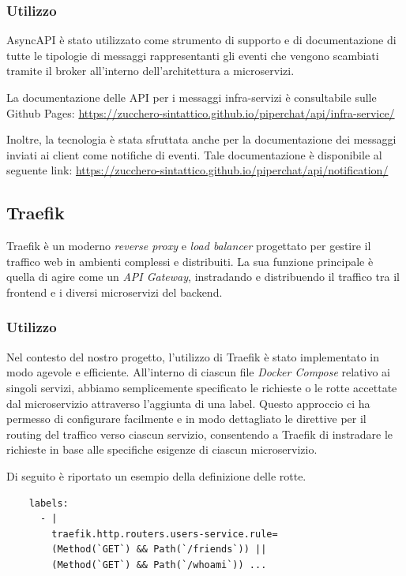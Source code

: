 %
%
%
\subsubsection{Utilizzo}

AsyncAPI è stato utilizzato come strumento di supporto e di documentazione di tutte le tipologie di messaggi rappresentanti gli eventi che vengono scambiati tramite il broker all'interno dell'architettura a microservizi.

La documentazione delle API per i messaggi infra-servizi è consultabile sulle Github Pages:
\url{https://zucchero-sintattico.github.io/piperchat/api/infra-service/}

Inoltre, la tecnologia è stata sfruttata anche per la documentazione dei messaggi inviati ai client come notifiche di eventi.
Tale documentazione è disponibile al seguente link:
\url{https://zucchero-sintattico.github.io/piperchat/api/notification/}

%
%
%
\subsection{Traefik}

Traefik è un moderno \emph{reverse proxy} e \emph{load balancer} progettato per gestire il traffico web in ambienti complessi e distribuiti.
%
La sua funzione principale è quella di agire come un \emph{API Gateway}, instradando e distribuendo il traffico tra il frontend e i diversi microservizi del backend.

%
%
%
\subsubsection{Utilizzo}

Nel contesto del nostro progetto, l'utilizzo di Traefik è stato implementato in modo agevole e efficiente.
%
All'interno di ciascun file \emph{Docker Compose} relativo ai singoli servizi, abbiamo semplicemente specificato le richieste o le rotte accettate dal microservizio attraverso l'aggiunta di una label.
%
Questo approccio ci ha permesso di configurare facilmente e in modo dettagliato le direttive per il routing del traffico verso ciascun servizio, consentendo a Traefik di instradare le richieste in base alle specifiche esigenze di ciascun microservizio.

Di seguito è riportato un esempio della definizione delle rotte.

\begin{verbatim}
    labels:
      - |
        traefik.http.routers.users-service.rule=
        (Method(`GET`) && Path(`/friends`)) ||
        (Method(`GET`) && Path(`/whoami`)) ...
\end{verbatim}

